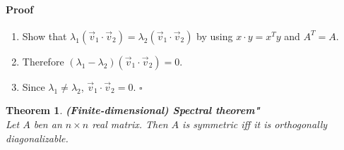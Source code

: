 \documentclass{article}
\theoremstyle{sltheorem}
\newtheorem{theorem}{Theorem}[section]
\begin{document}
\paragraph*{Proof}
\begin{enumerate}
    \item Show that $\lambda_1(\vec v_1 \cdot \vec v_2)=\lambda_2(\vec v_1\cdot\vec v_2)$ by using $x\cdot y =x^Ty$ and $A^T=A$.
    \item Therefore $(\lambda_1-\lambda_2)(\vec v_1 \cdot \vec v_2)=0$.
    \item Since $\lambda_1\not=\lambda_2$, $\vec v_1 \cdot \vec v_2=0$. $\square$
\end{enumerate}
\begin{theorem}
    \textbf{(Finite-dimensional) Spectral theorem"}\\
    Let $A$ ben an $n\times n$ real matrix. Then $A$ is symmetric iff it is orthogonally diagonalizable.
\end{theorem}
\end{document}
